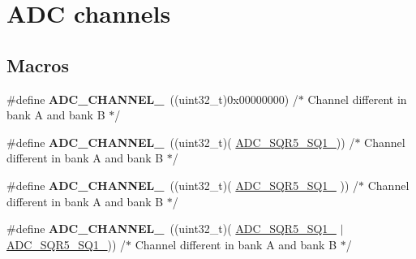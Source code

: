 \hypertarget{group___a_d_c__channels}{\section{A\-D\-C channels}
\label{group___a_d_c__channels}
}
\subsection*{Macros}
\begin{DoxyCompactItemize}
\item 
\hypertarget{group___a_d_c__channels_ga3c5075aee5af4eae02f1a72d6216199c}{\#define {\bfseries A\-D\-C\-\_\-\-C\-H\-A\-N\-N\-E\-L\-\_}~((uint32\-\_\-t)0x00000000)                                                                            /$\ast$ Channel different in bank A and bank B $\ast$/}\label{group___a_d_c__channels_ga3c5075aee5af4eae02f1a72d6216199c}

\item 
\hypertarget{group___a_d_c__channels_gaeb119201733a871c94971c51843ffaac}{\#define {\bfseries A\-D\-C\-\_\-\-C\-H\-A\-N\-N\-E\-L\-\_}~((uint32\-\_\-t)(                                                                    \hyperlink{group___peripheral___registers___bits___definition_ga6d7b92bf8ba789b76256e205988cc8de}{A\-D\-C\-\_\-\-S\-Q\-R5\-\_\-\-S\-Q1\-\_}))  /$\ast$ Channel different in bank A and bank B $\ast$/}\label{group___a_d_c__channels_gaeb119201733a871c94971c51843ffaac}

\item 
\hypertarget{group___a_d_c__channels_gad576132ebd78a3429be34f44e474c914}{\#define {\bfseries A\-D\-C\-\_\-\-C\-H\-A\-N\-N\-E\-L\-\_}~((uint32\-\_\-t)(                                                   \hyperlink{group___peripheral___registers___bits___definition_ga374490cc8d96ed0a40d3f212bc6fd6d1}{A\-D\-C\-\_\-\-S\-Q\-R5\-\_\-\-S\-Q1\-\_}                 ))  /$\ast$ Channel different in bank A and bank B $\ast$/}\label{group___a_d_c__channels_gad576132ebd78a3429be34f44e474c914}

\item 
\hypertarget{group___a_d_c__channels_ga56dba5d35f1f7bcad41e4f9a7da3b125}{\#define {\bfseries A\-D\-C\-\_\-\-C\-H\-A\-N\-N\-E\-L\-\_}~((uint32\-\_\-t)(                                                   \hyperlink{group___peripheral___registers___bits___definition_ga374490cc8d96ed0a40d3f212bc6fd6d1}{A\-D\-C\-\_\-\-S\-Q\-R5\-\_\-\-S\-Q1\-\_} $\vert$ \hyperlink{group___peripheral___registers___bits___definition_ga6d7b92bf8ba789b76256e205988cc8de}{A\-D\-C\-\_\-\-S\-Q\-R5\-\_\-\-S\-Q1\-\_}))  /$\ast$ Channel different in bank A and bank B $\ast$/}\label{group___a_d_c__channels_ga56dba5d35f1f7bcad41e4f9a7da3b125}


\end{DoxyCompactItemize}
